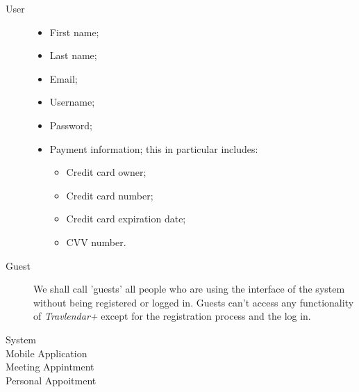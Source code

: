 \begin{description}
				\item[User] 
				\begin{itemize}
					\item First name;
					\item Last name; 
					\item Email;
					\item Username;
					\item Password;
					\item Payment information; this in particular includes:
						\begin{itemize}
							\item Credit card owner;
							\item Credit card number;
							\item Credit card expiration date;
							\item CVV number.
						\end{itemize}
				\end{itemize}
				
				\item[Guest] We shall call 'guests' all people who are using the interface of the system without being registered or logged in. Guests can't access any functionality of \textit{Travlendar+} except for the registration process and the log in. 
				
				\item[System]
				\item[Mobile Application]
				\item[Meeting Appintment]
				\item[Personal Appoitment]
				
\end{description}
